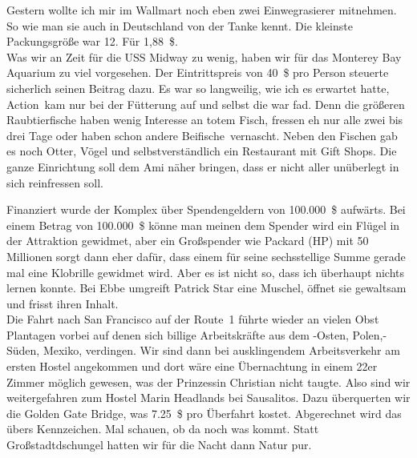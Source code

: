 Gestern wollte ich mir im Wallmart noch eben zwei Einwegrasierer mitnehmen.
So wie man sie auch in Deutschland von der Tanke kennt.
Die kleinste Packungsgröße war 12.
Für 1,88~\$.\\

Was wir an Zeit für die USS Midway zu wenig, haben wir für das Monterey Bay Aquarium zu viel vorgesehen.
Der Eintrittspreis von 40~\$ pro Person steuerte sicherlich seinen Beitrag dazu.
Es war so langweilig, wie ich es erwartet hatte,
\glqq Action\grqq \, kam nur bei der Fütterung auf und selbst die war fad.
Denn die größeren Raubtierfische haben wenig Interesse an totem Fisch, fressen eh nur alle zwei bis drei Tage oder haben schon andere \glqq Beifische\grqq \, vernascht.
Neben den Fischen gab es noch Otter, Vögel und selbstverständlich ein Restaurant mit Gift Shops.
Die ganze Einrichtung soll dem Ami näher bringen, dass er nicht aller unüberlegt in sich reinfressen soll.

Finanziert wurde der Komplex über Spendengeldern von 100.000~\$ aufwärts.
Bei einem Betrag von 100.000~\$ könne man meinen dem Spender wird ein Flügel in der Attraktion gewidmet, aber ein Großspender wie Packard (HP) mit 50 Millionen sorgt dann eher dafür, dass einem für seine sechsstellige Summe gerade mal eine Klobrille gewidmet wird.
Aber es ist nicht so, dass ich überhaupt nichts lernen konnte.
Bei Ebbe umgreift Patrick Star eine Muschel, öffnet sie gewaltsam und frisst ihren Inhalt.\\

Die Fahrt nach San Francisco auf der Route~1 führte wieder an vielen Obst Plantagen vorbei auf denen sich billige Arbeitskräfte aus dem -Osten, Polen,- Süden, Mexiko, verdingen.
Wir sind dann bei ausklingendem Arbeitsverkehr am ersten Hostel angekommen und dort wäre eine Übernachtung in einem 22er Zimmer möglich gewesen, was der Prinzessin Christian nicht taugte.
Also sind wir weitergefahren zum Hostel Marin Headlands bei Sausalitos.
Dazu überquerten wir die Golden Gate Bridge, was 7.25~\$ pro Überfahrt kostet.
Abgerechnet wird das übers Kennzeichen.
Mal schauen, ob da noch was kommt.
Statt Großstadtdschungel hatten wir für die Nacht dann Natur pur.

